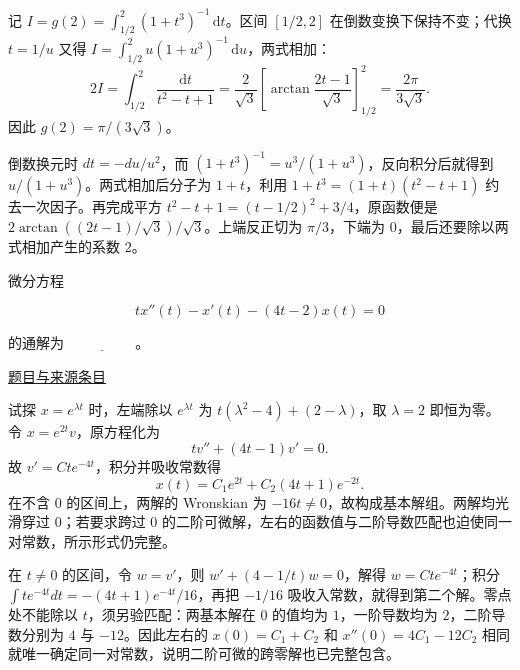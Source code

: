 \documentclass[UTF8,12pt,a4paper,fontset=fandol]{ctexart}
\begin{document}
\begin{solve}\label{ans:fin17-high:3}

记 $I=g(2)=\int_{1/2}^2(1+t^3)^{-1}\,\mathrm dt$。区间 $[1/2,2]$ 在倒数变换下保持不变；代换 $t=1/u$ 又得 $I=\int_{1/2}^2u(1+u^3)^{-1}\,\mathrm du$，两式相加：
\[
2I=\int_{1/2}^2\frac{\mathrm dt}{t^2-t+1}
=\frac2{\sqrt3}\left[\arctan\frac{2t-1}{\sqrt3}\right]_{1/2}^2
=\frac{2\pi}{3\sqrt3}.
\]
因此 $\boxed{g(2)=\pi/(3\sqrt3)}$。

倒数换元时 $dt=-du/u^2$，而 $(1+t^3)^{-1}=u^3/(1+u^3)$，反向积分后就得到 $u/(1+u^3)$。两式相加后分子为 $1+t$，利用 $1+t^3=(1+t)(t^2-t+1)$ 约去一次因子。再完成平方 $t^2-t+1=(t-1/2)^2+3/4$，原函数便是 $2\arctan((2t-1)/\sqrt3)/\sqrt3$。上端反正切为 $\pi/3$，下端为 $0$，最后还要除以两式相加产生的系数 $2$。

\end{solve}

\begin{example}[来源序号4]\label{ex:fin17-high:4}\label{pr:fin17-high:4}

微分方程

\[
tx''(t)-x'(t)-(4t-2)x(t)=0
\]

的通解为 $\underline{\hspace{2cm}}$。

\par\href{https://github.com/lzxcr/cmc-mathematics/blob/64916fa1fdbc3e444a652eca204d5669058ee321/src/problems/finals/17/04.md}{题目与来源条目}

\end{example}

\begin{solve}\label{ans:fin17-high:4}

试探 $x=e^{\lambda t}$ 时，左端除以 $e^{\lambda t}$ 为 $t(\lambda^2-4)+(2-\lambda)$，取 $\lambda=2$ 即恒为零。令 $x=e^{2t}v$，原方程化为
\[
tv''+(4t-1)v'=0.
\]
故 $v'=Cte^{-4t}$，积分并吸收常数得
\[
\boxed{x(t)=C_1e^{2t}+C_2(4t+1)e^{-2t}}.
\]
在不含 $0$ 的区间上，两解的 Wronskian 为 $-16t\ne0$，故构成基本解组。两解均光滑穿过 $0$；若要求跨过 $0$ 的二阶可微解，左右的函数值与二阶导数匹配也迫使同一对常数，所示形式仍完整。

在 $t\ne0$ 的区间，令 $w=v'$，则 $w'+(4-1/t)w=0$，解得 $w=Cte^{-4t}$；积分 $\int te^{-4t}dt=-(4t+1)e^{-4t}/16$，再把 $-1/16$ 吸收入常数，就得到第二个解。零点处不能除以 $t$，须另验匹配：两基本解在 $0$ 的值均为 $1$，一阶导数均为 $2$，二阶导数分别为 $4$ 与 $-12$。因此左右的 $x(0)=C_1+C_2$ 和 $x''(0)=4C_1-12C_2$ 相同就唯一确定同一对常数，说明二阶可微的跨零解也已完整包含。

\end{solve}
\end{document}
